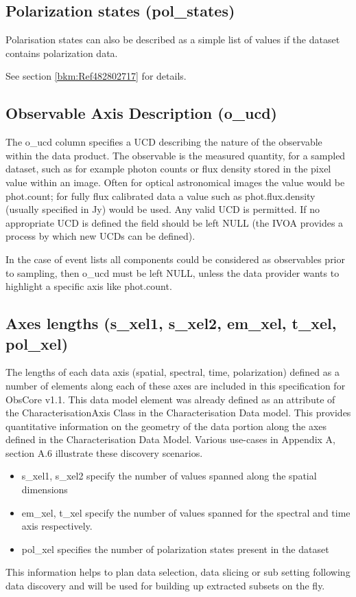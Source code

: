 \documentclass[11pt,a4paper]{ivoa}
\begin{document}
\subsection{Polarization states (pol\_states)}
Polarisation states can also be described as a simple list of values if the dataset contains polarization data.

See section  \ref{bkm:Ref482802717} for details.

\subsection{Observable Axis Description (o\_ucd)}
The o\_ucd column specifies a UCD \citep{2007ivoa.spec.0402P} describing the nature of the observable within the data
product.  The observable is the measured quantity, for a sampled dataset, such as for example photon counts or flux
density stored in the pixel value within an image. Often for optical astronomical images the value would be phot.count;
for fully flux calibrated data a value such as phot.flux.density (usually specified in Jy) would be used. Any valid UCD
is permitted.  If no appropriate UCD is defined the field should be left NULL (the IVOA provides a process by which new
UCDs can be defined).

In the case of event lists all components could be considered as observables prior to sampling, then o\_ucd must be left
NULL, unless the data provider wants to highlight a specific axis like phot.count.

\subsection{Axes lengths (s\_xel1, s\_xel2, em\_xel, t\_xel, pol\_xel)}
The lengths of each data axis (spatial, spectral, time, polarization) defined as a number of elements along each of
these axes are included in this specification for ObsCore v1.1. This data model element was already defined as an
attribute of the CharacterisationAxis Class in the Characterisation Data model. This provides quantitative information
on the geometry of the data portion along the axes defined in the Characterisation Data Model. Various use-cases in
Appendix A, section A.6 illustrate these discovery scenarios.

\begin{itemize}
\item s\_xel1, s\_xel2  specify the number of values spanned  along the spatial dimensions
\item em\_xel, t\_xel specify the number of values spanned for the spectral and time axis respectively.
\item pol\_xel specifies the number of polarization states present in the dataset
\end{itemize}
This information helps to plan data selection, data slicing or sub setting following data discovery and will be used for
building up extracted subsets on the fly.
\end{document}
